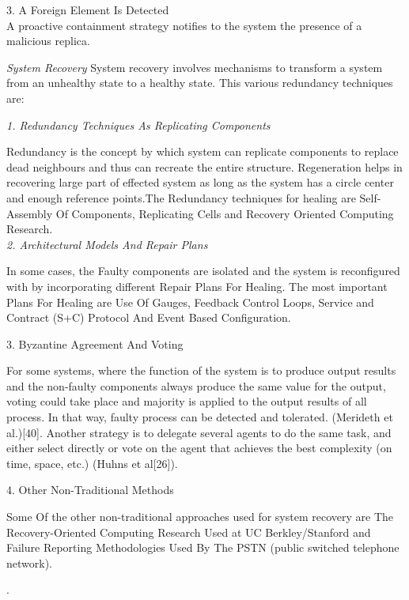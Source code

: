 3. A Foreign Element Is Detected\\
A proactive containment strategy notifies to the system the presence of a malicious replica.

\textit{System Recovery}
System recovery involves mechanisms to transform a system from an unhealthy state to a healthy state. 
This various redundancy techniques are:

\textit{1. Redundancy Techniques As Replicating Components}

Redundancy is the concept by which system can replicate components to replace dead neighbours and thus can recreate the entire structure.
Regeneration helps in recovering large part of effected system as long as the system has a circle center and enough reference points.The Redundancy techniques for healing are Self-Assembly Of Components, Replicating Cells and Recovery Oriented Computing Research.\\

\textit{2. Architectural Models And Repair Plans}

In some cases, the Faulty components 
are isolated and the system is reconfigured 
with by incorporating different Repair Plans For Healing. The most important Plans For Healing are Use Of Gauges, Feedback Control Loops, Service and Contract (S+C) Protocol And Event Based Configuration.

3. Byzantine Agreement And Voting

For some systems, where the function of the system is to produce output results and the non-faulty components always produce the same value for the output, voting could take place and majority is applied to the output results of all process. In that way, faulty process can be detected and tolerated. (Merideth et al.)[40]. Another strategy is to delegate several agents to do the same task, and either select directly or vote on the agent that achieves the best complexity (on time, space, etc.) (Huhns et al[26]).

4. Other Non-Traditional Methods

Some Of the other non-traditional approaches used for system recovery are The Recovery-Oriented Computing Research Used at UC Berkley/Stanford and Failure Reporting Methodologies Used By The PSTN (public switched telephone network). 

\cite{Ghosh:SelfHealingSurvey:2007}.\\









